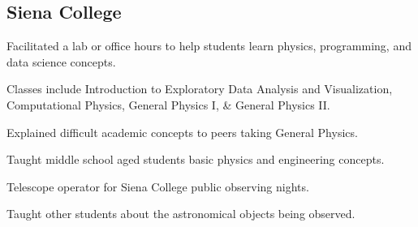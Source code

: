 \documentclass[a4paper, 12pt]{article}
\begin{document}
\vspace*{8pt}
\subsection {{Siena College}}
\begin{zitemize}
\item Facilitated a lab or office hours to help students learn physics, programming, and data science concepts.
\item Classes include Introduction to Exploratory Data Analysis and Visualization, Computational Physics, General Physics I, \& General Physics II.
\end{zitemize}

\vspace*{5pt}
\begin{zitemize}
\item Explained difficult academic concepts to peers taking General Physics.
\end{zitemize}

\vspace*{5pt}
\begin{zitemize}
    \item Taught middle school aged students basic physics and engineering concepts.
\end{zitemize}

\vspace*{5pt}
\begin{zitemize}
    \item Telescope operator for Siena College public observing nights.
    \item Taught other students about the astronomical objects being observed. 
\end{zitemize}
\vspace*{5pt}
\end{document}

